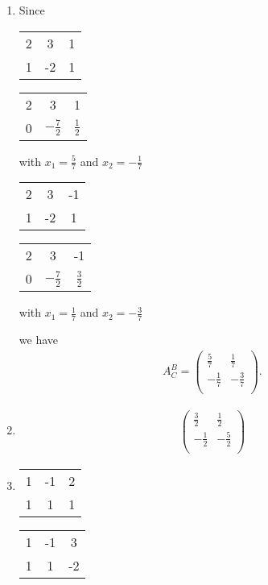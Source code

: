 \documentclass{article}
\begin{document}
\begin{enumerate}
    \item Since
    \begin{center}
        \begin{tabular}{c c | c}
            2 & 3 & 1 \\
            1 & -2 & 1 \\
        \end{tabular}\quad
        \begin{tabular}{c c | c}
            2 & 3 & 1 \\
            0 & $-\frac{7}{2}$ & $\frac{1}{2}$ \\
        \end{tabular} \quad with $x_1 = \frac{5}{7}$ and $x_2 = -\frac{1}{7}$
    \end{center}
    \begin{center}
        \begin{tabular}{c c | c}
            2 & 3 & -1 \\
            1 & -2 & 1 \\
        \end{tabular}\quad
        \begin{tabular}{c c | c}
            2 & 3 & -1 \\
            0 & $-\frac{7}{2}$ & $\frac{3}{2}$ \\
        \end{tabular} \quad with $x_1 = \frac{1}{7}$ and $x_2 = -\frac{3}{7}$
    \end{center}
    we have
    \begin{align*}
        A_C^B = \begin{pmatrix}
            \frac{5}{7} & \frac{1}{7} \\
            -\frac{1}{7} & -\frac{3}{7} \\
        \end{pmatrix}.
    \end{align*}

    \item \begin{align*}\begin{pmatrix}
        \frac{3}{2} & \frac{1}{2} \\
        -\frac{1}{2} & -\frac{5}{2} \\
    \end{pmatrix}\end{align*}

    \item \phantom{} \begin{center}
        \begin{tabular}{c c | c}
            1 & -1 & 2 \\
            1 & 1 & 1 \\
        \end{tabular} \quad {} \begin{tabular}{c c | c}
            1 & -1 & 3 \\
            1 & 1 & -2 \\
        \end{tabular}
    \end{center}


\end{enumerate}
\end{document}
